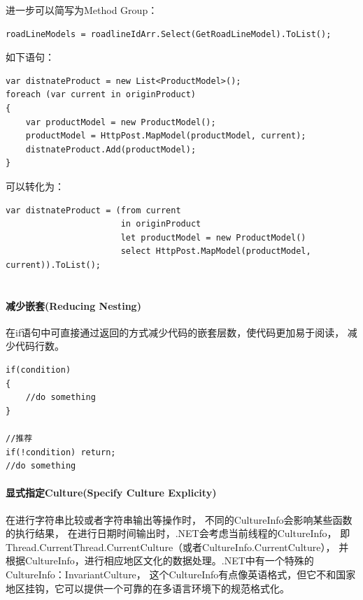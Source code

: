 \documentclass{book}
\begin{document}
进一步可以简写为Method Group：

\begin{lstlisting}[language={[Sharp]C}]
roadLineModels = roadlineIdArr.Select(GetRoadLineModel).ToList();
\end{lstlisting}

如下语句：

\begin{lstlisting}[language={[Sharp]C}]
var distnateProduct = new List<ProductModel>();
foreach (var current in originProduct)
{
    var productModel = new ProductModel();
    productModel = HttpPost.MapModel(productModel, current);
    distnateProduct.Add(productModel);
}
\end{lstlisting}

可以转化为：

\begin{lstlisting}[language={[Sharp]C}]
 var distnateProduct = (from current 
                       in originProduct 
                       let productModel = new ProductModel() 
                       select HttpPost.MapModel(productModel, current)).ToList();
                
\end{lstlisting}


\paragraph{减少嵌套(Reducing Nesting)}

在if语句中可直接通过返回的方式减少代码的嵌套层数，使代码更加易于阅读，
减少代码行数。

\begin{lstlisting}[language={[Sharp]C}]
if(condition)
{
	//do something
}

//推荐
if(!condition) return;
//do something
\end{lstlisting}

\paragraph{显式指定Culture(Specify Culture Explicity)}

在进行字符串比较或者字符串输出等操作时，
不同的CultureInfo会影响某些函数的执行结果，
在进行日期时间输出时，.NET会考虑当前线程的CultureInfo，
即Thread.CurrentThread.CurrentCulture（或者CultureInfo.CurrentCulture），
并根据CultureInfo，进行相应地区文化的数据处理。.NET中有一个特殊的CultureInfo：InvariantCulture，
这个CultureInfo有点像英语格式，但它不和国家地区挂钩，它可以提供一个可靠的在多语言环境下的规范格式化。
\end{document}
